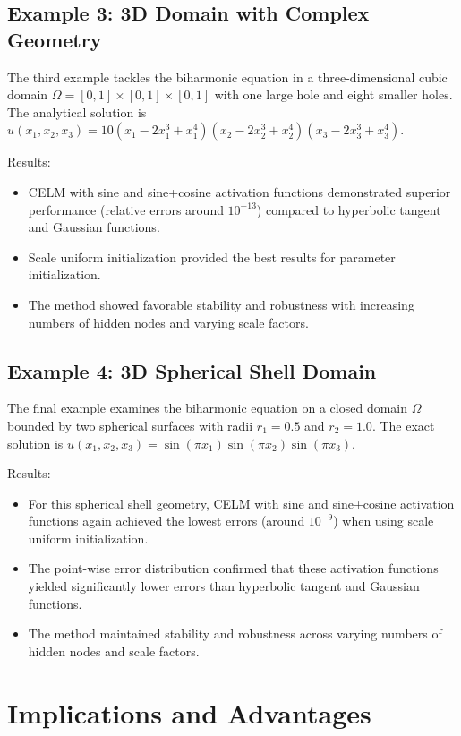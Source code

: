 \documentclass[11pt]{article}
\begin{document}
\subsection{Example 3: 3D Domain with Complex Geometry}

The third example tackles the biharmonic equation in a three-dimensional cubic domain $\Omega = [0,1] \times [0,1] \times [0,1]$ with one large hole and eight smaller holes. The analytical solution is $u(x_1, x_2, x_3) = 10(x_1 - 2x_1^3 + x_1^4)(x_2 - 2x_2^3 + x_2^4)(x_3 - 2x_3^3 + x_3^4)$.

Results:
\begin{itemize}
    \item CELM with sine and sine+cosine activation functions demonstrated superior performance (relative errors around $10^{-13}$) compared to hyperbolic tangent and Gaussian functions.
    \item Scale uniform initialization provided the best results for parameter initialization.
    \item The method showed favorable stability and robustness with increasing numbers of hidden nodes and varying scale factors.
\end{itemize}

\subsection{Example 4: 3D Spherical Shell Domain}

The final example examines the biharmonic equation on a closed domain $\Omega$ bounded by two spherical surfaces with radii $r_1 = 0.5$ and $r_2 = 1.0$. The exact solution is $u(x_1, x_2, x_3) = \sin(\pi x_1)\sin(\pi x_2)\sin(\pi x_3)$.

Results:
\begin{itemize}
    \item For this spherical shell geometry, CELM with sine and sine+cosine activation functions again achieved the lowest errors (around $10^{-9}$) when using scale uniform initialization.
    \item The point-wise error distribution confirmed that these activation functions yielded significantly lower errors than hyperbolic tangent and Gaussian functions.
    \item The method maintained stability and robustness across varying numbers of hidden nodes and scale factors.
\end{itemize}

\section{Implications and Advantages}
\end{document}
